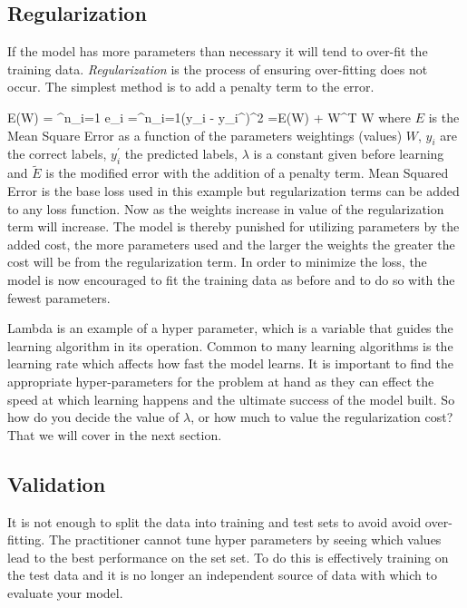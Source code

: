 	\subsection{Regularization}
    
If the model has more parameters than necessary it will tend to over-fit the training data\citep{goyal2014object}.
\textit{Regularization} is the process of ensuring over-fitting does not occur.
The simplest method is to add a penalty term to the error.

\be
E(W) = \sum^n_{i=1} e_i =\sum^n_{i=1}(y_i - y_i^\prime)^2
\ee
\be
{}=E(W) + W^T W
\ee
where $E$ is the Mean Square Error as a function of the parameters weightings (values) $W$, $y_i$ are the correct labels, $y_i^\prime$ the predicted labels, $\lambda$ is a constant given before learning and $\widetilde{E}$ is the modified error with the addition of a penalty term.
Mean Squared Error is the base loss used in this example but regularization terms can be added to any loss function.
Now as the weights increase in value of the regularization term will increase.
The model is thereby punished for utilizing parameters by the added cost, the more parameters used and the larger the weights the greater the cost will be from the regularization term\citep{goyal2014object}.
In order to minimize the loss, the model is now encouraged to fit the training data as before and to do so with the fewest parameters.

Lambda is an example of a hyper parameter, which is a variable that guides the learning algorithm in its operation.
Common to many learning algorithms is the learning rate which affects how fast the model learns.
It is important to find the appropriate hyper-parameters for the problem at hand as they can effect the speed at which learning happens and the ultimate success of the model built.
So how do you decide the value of $\lambda$, or how much to value the regularization cost?
That we will cover in the next section.


        \subsection{Validation}

It is not enough to split the data into training and test sets to avoid avoid over-fitting.
The practitioner cannot tune hyper parameters by seeing which values lead to the best performance on the set set.
To do this is effectively training on the test data and it is no longer an independent source of data with which to evaluate your model\citep{witten2005data}.

